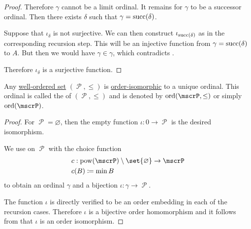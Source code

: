 \begin{proof}
  Therefore \( \gamma \) cannot be a limit ordinal. It remains for \( \gamma \) to be a successor ordinal. Then there exists \( \delta \) such that \( \gamma = \operatorname{succ}(\delta) \).

  Suppose that \( \iota_\delta \) is not surjective. We can then construct \( \iota_{\operatorname{succ}(\delta)} \) as in the corresponding recursion step. This will be an injective function from \( \gamma = \operatorname{succ}(\delta) \) to \( A \). But then we would have \( \gamma \in \gamma \), which contradicts .

  Therefore \( \iota_\delta \) is a surjective function.
\end{proof}

\begin{proposition}\label{thm:well_ordered_order_type_existence}
  Any \hyperref[def:well_ordered_set]{well-ordered set} \( (\mscrP, \leq) \) is \hyperref[def:partially_ordered_set/homomorphism]{order-isomorphic} to a unique ordinal. This ordinal is called the  of \( (\mscrP, \leq) \) and is denoted by \( \ord(\mscrP, \leq) \) or simply \( \ord(\mscrP) \).
\end{proposition}
\begin{proof}
  For \( \mscrP = \varnothing \), then the empty function \( \iota: 0 \to \mscrP \) is the desired isomorphism.

  We use  on \( \mscrP \) with the choice function
  \begin{equation*}
    \begin{aligned}
      &c: \pow(\mscrP) \setminus \set{ \varnothing } \to \mscrP \\
      &c(B) \coloneqq \min B
    \end{aligned}
  \end{equation*}
  to obtain an ordinal \( \gamma \) and a bijection \( \iota: \gamma \to \mscrP \).

  The function \( \iota \) is directly verified to be an order embedding in each of the recursion cases. Therefore \( \iota \) is a bijective order homomorphism and it follows from  that \( \iota \) is an order isomorphism.
\end{proof}


